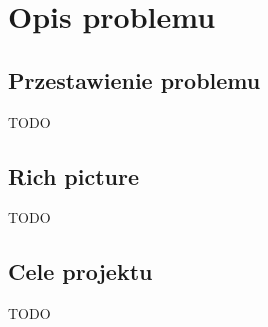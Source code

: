 
\chapter{Opis problemu}
\label{ch:opis-problemu}

\section{Przestawienie problemu}
\label{sec:przestawienie-problemu}

TODO

\section{Rich picture}
\label{sec:rich-picture}

TODO

\section{Cele projektu}
\label{sec:cele-projektu}

TODO
